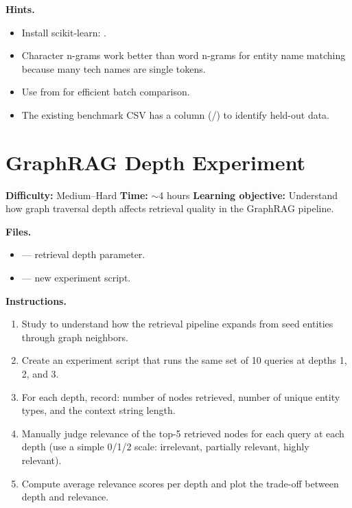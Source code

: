 \medskip\noindent\textbf{Hints.}

\begin{itemize}
    \item Install scikit-learn: .
    \item Character n-grams work better than word n-grams for entity name
          matching because many tech names are single tokens.
    \item Use  from
           for efficient batch comparison.
    \item The existing benchmark CSV has a  column
          (/) to identify held-out data.
\end{itemize}


\section{GraphRAG Depth Experiment}
\label{sec:ex-graphrag-depth}

\noindent\textbf{Difficulty:} Medium--Hard \quad
\textbf{Time:} $\sim$4 hours \quad
\textbf{Learning objective:} Understand how graph traversal depth affects
retrieval quality in the GraphRAG pipeline.

\medskip\noindent\textbf{Files.}

\begin{itemize}
    \item {} --- retrieval depth
          parameter.
    \item {} --- new experiment script.
\end{itemize}

\medskip\noindent\textbf{Instructions.}

\begin{enumerate}
    \item Study  to understand how the
          retrieval pipeline expands from seed entities through graph
          neighbors.
    \item Create an experiment script that runs the same set of 10 queries
          at depths 1, 2, and 3.
    \item For each depth, record: number of nodes retrieved, number of
          unique entity types, and the context string length.
    \item Manually judge relevance of the top-5 retrieved nodes for each
          query at each depth (use a simple 0/1/2 scale: irrelevant,
          partially relevant, highly relevant).
    \item Compute average relevance scores per depth and plot the
          trade-off between depth and relevance.
\end{enumerate}

